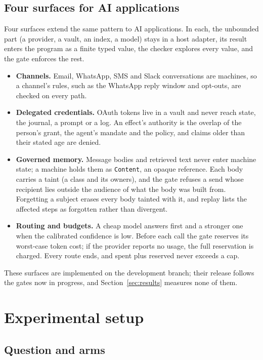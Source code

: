 \documentclass[11pt]{article}
\begin{document}
\subsection{Four surfaces for AI applications}

Four surfaces extend the same pattern to AI applications. In each, the unbounded part (a provider, a vault, an index, a model) stays in a host adapter, its result enters the program as a finite typed value, the checker explores every value, and the gate enforces the rest.

\begin{itemize}
\item \textbf{Channels.} Email, WhatsApp, SMS and Slack conversations are machines, so a channel's rules, such as the WhatsApp reply window and opt-outs, are checked on every path.
\item \textbf{Delegated credentials.} OAuth tokens live in a vault and never reach state, the journal, a prompt or a log. An effect's authority is the overlap of the person's grant, the agent's mandate and the policy, and claims older than their stated age are denied.
\item \textbf{Governed memory.} Message bodies and retrieved text never enter machine state; a machine holds them as \texttt{Content}, an opaque reference. Each body carries a taint (a class and its owners), and the gate refuses a send whose recipient lies outside the audience of what the body was built from. Forgetting a subject erases every body tainted with it, and replay lists the affected steps as forgotten rather than divergent.
\item \textbf{Routing and budgets.} A cheap model answers first and a stronger one when the calibrated confidence is low. Before each call the gate reserves its worst-case token cost; if the provider reports no usage, the full reservation is charged. Every route ends, and spent plus reserved never exceeds a cap.
\end{itemize}

These surfaces are implemented on the development branch; their release follows the gates now in progress, and Section~\ref{sec:results} measures none of them.

\section{Experimental setup}
\label{sec:setup}

\subsection{Question and arms}
\end{document}
